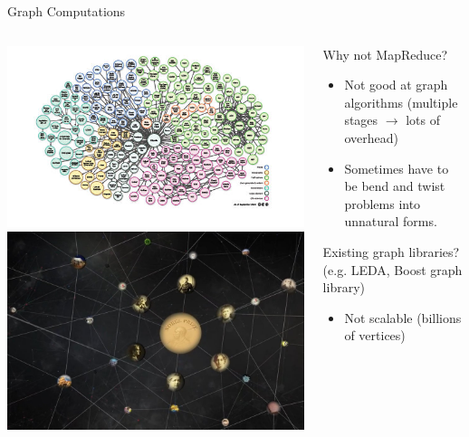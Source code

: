 \documentclass[onlymath,xcolor=pdftex,dvipsnames,table]{beamer}
\theoremstyle{remark} %
\begin{document}
\begin{frame}{Graph Computations}
\begin{columns}
  \begin{column}{.5\textwidth}
    \includegraphics[width=\columnwidth]{linkdata.jpg}\\
    \includegraphics[width=\columnwidth]{kowledgegraph.jpg}
  \end{column}
  \begin{column}{.5\textwidth}
    Why not MapReduce?
    \begin{itemize}
      \item Not good at graph algorithms (multiple stages $\rightarrow$ lots of overhead)
      \item Sometimes have to be bend and twist problems into unnatural forms.
    \end{itemize}
    Existing graph libraries? (e.g. LEDA, Boost graph library)
    \begin{itemize}
      \item Not scalable (billions of vertices)
    \end{itemize}
  \end{column}
\end{columns}
\end{frame}
\end{document}
